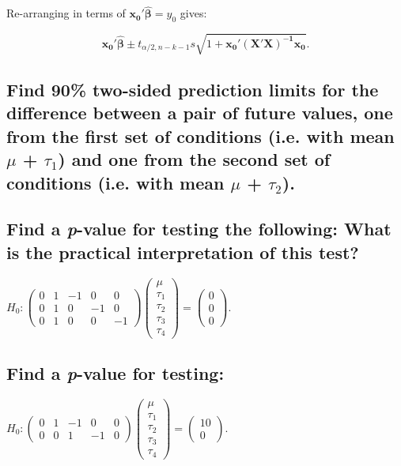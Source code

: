 \documentclass[11pt]{article}
\begin{document}
Re-arranging in terms of $\mathbf{x_0'\hat{\beta}} = \hat{y}_0$ gives:

$$\mathbf{x_0'\hat{\beta}} \pm t_{\alpha/2,n-k-1}s\sqrt{1+
\mathbf{x_0'(X'X)^{-1}x_0}}.$$
\subsection{Find 90\% two-sided prediction limits for the difference between a pair of future values, one from the first set of conditions (i.e. with mean $\mu$ + $\tau$$_1$) and one from the second set of conditions (i.e. with mean $\mu$ + $\tau$$_2$).}
\label{sec-1-6}
\subsection{Find a \emph{p}-value for testing the following: What is the practical interpretation of this test?}
\label{sec-1-7}

\( H_0 : \begin{pmatrix} 0 & 1 & -1 & 0 & 0 \\ 0 & 1 & 0 & -1 & 0 \\ 0 & 1 & 0 & 0 & -1 \end{pmatrix} \begin{pmatrix} \mu \\ \tau_1 \\ \tau_2 \\ \tau_3 \\ \tau_4 \end{pmatrix} = \begin{pmatrix} 0 \\ 0 \\ 0 \end{pmatrix}. \) 
\subsection{Find a \emph{p}-value for testing:}
\label{sec-1-8}

\(H_0 : \begin{pmatrix} 0 & 1 & -1 & 0 & 0 \\ 0 & 0 & 1 & -1 & 0
\end{pmatrix} \begin{pmatrix} \mu \\ \tau_1 \\ \tau_2 \\ \tau_3
\\ \tau_4 \end{pmatrix} = \begin{pmatrix} 10 \\ 0  \end{pmatrix}.\)
\end{document}
